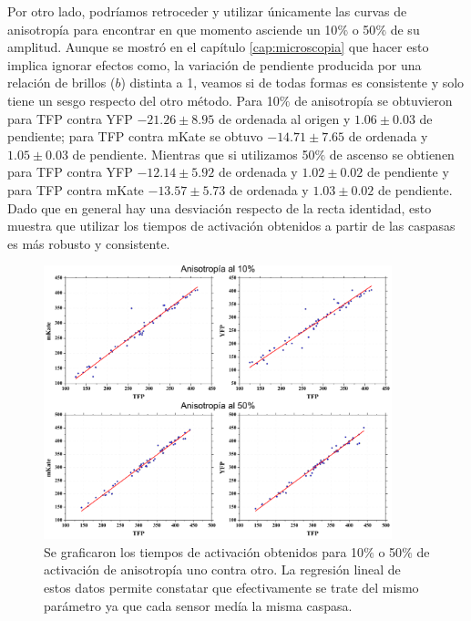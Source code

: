 
Por otro lado, podríamos retroceder y utilizar únicamente las curvas de anisotropía para encontrar en que momento asciende un 10$\%$ o 50$\%$ de su amplitud. Aunque se mostró en el capítulo \ref{cap:microscopia} que hacer esto implica ignorar efectos como, la variación de pendiente producida por una relación de brillos ($b$) distinta a 1, veamos si de todas formas es consistente y solo tiene un sesgo respecto del otro método. Para 10$\%$ de anisotropía se obtuvieron para TFP contra YFP $-21.26 \pm 8.95$ de ordenada al origen y $1.06 \pm 0.03$ de pendiente; para TFP contra mKate se obtuvo $-14.71 \pm 7.65$ de ordenada y $1.05 \pm 0.03$ de pendiente. Mientras que si utilizamos 50$\%$ de ascenso se obtienen para TFP contra YFP $-12.14 \pm 5.92$ de ordenada y $1.02 \pm 0.02$ de pendiente y para TFP contra mKate $-13.57 \pm 5.73$ de ordenada y $1.03 \pm 0.02$ de pendiente. Dado que en general hay una desviación respecto de la recta identidad, esto muestra que utilizar  los tiempos de activación obtenidos a partir de las caspasas es más robusto y consistente.








\begin{figure}
    \centering
    \includegraphics[width=0.9\textwidth]{./img/Cap4/AnisReg.png}
    \caption{Se graficaron los tiempos de activación obtenidos para 10$\%$ o 50$\%$ de activación de anisotropía uno contra otro. La regresión lineal de estos datos permite constatar que efectivamente se trate del mismo parámetro ya que cada sensor medía la misma caspasa.}
    \label{fig:OneCasp_reg_anis}
\end{figure}

